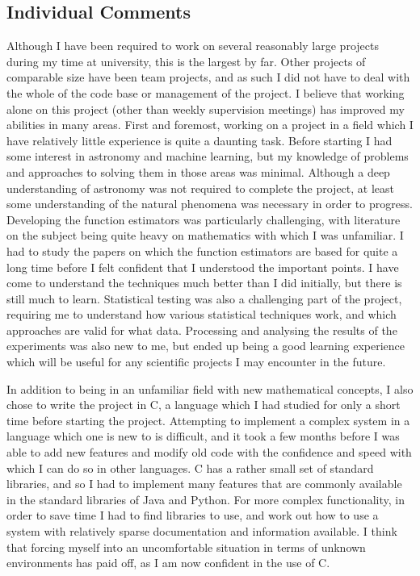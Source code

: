 \documentclass[a4paper,11pt]{article}
\begin{document}
\subsection{Individual Comments}
\label{sec-8-2}

   Although I have been required to work on several reasonably large projects
   during my time at university, this is the largest by far. Other projects of
   comparable size have been team projects, and as such I did not have to deal
   with the whole of the code base or management of the project. I believe that
   working alone on this project (other than weekly supervision meetings) has
   improved my abilities in many areas. First and foremost, working on a project
   in a field which I have relatively little experience is quite a daunting
   task. Before starting I had some interest in astronomy and machine learning,
   but my knowledge of problems and approaches to solving them in those areas
   was minimal. Although a deep understanding of astronomy was not required to
   complete the project, at least some understanding of the natural phenomena
   was necessary in order to progress. Developing the function estimators was
   particularly challenging, with literature on the subject being quite heavy on
   mathematics with which I was unfamiliar. I had to study the papers on which
   the function estimators are based for quite a long time before I felt
   confident that I understood the important points. I have come to understand
   the techniques much better than I did initially, but there is still much to
   learn. Statistical testing was also a challenging part of the project,
   requiring me to understand how various statistical techniques work, and which
   approaches are valid for what data. Processing and analysing the results of
   the experiments was also new to me, but ended up being a good learning
   experience which will be useful for any scientific projects I may encounter
   in the future.

   In addition to being in an unfamiliar field with new mathematical concepts, I
   also chose to write the project in C, a language which I had studied for only
   a short time before starting the project. Attempting to implement a complex
   system in a language which one is new to is difficult, and it took a few
   months before I was able to add new features and modify old code with the
   confidence and speed with which I can do so in other languages. C has a
   rather small set of standard libraries, and so I had to implement many
   features that are commonly available in the standard libraries of Java and
   Python. For more complex functionality, in order to save time I had to find
   libraries to use, and work out how to use a system with relatively sparse
   documentation and information available. I think that forcing myself into an
   uncomfortable situation in terms of unknown environments has paid off, as I
   am now confident in the use of C. 
\end{document}

